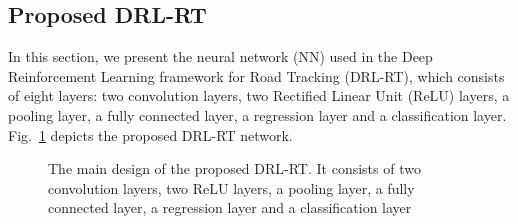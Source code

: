 \documentclass{svproc}
\begin{document}
%	
	
\subsection{Proposed DRL-RT} 
	In this section, we present the neural network (NN) used in the Deep Reinforcement Learning framework for Road Tracking (DRL-RT), which consists of eight layers: two convolution layers, two Rectified Linear Unit (ReLU) layers, a pooling layer, a fully connected layer, a regression layer and a classification layer. Fig.~\ref{Fig:Deep_Reinf_Net} depicts the proposed DRL-RT network.

\begin{figure}[!h]
	\vspace{-2ex}
	\centering
	\vspace{-2ex}
	\begin{scriptsize}	
		\caption{The main design of the proposed DRL-RT. It consists of two convolution layers, two ReLU layers, a pooling layer, a fully connected layer, a regression layer and a classification layer\label{Fig:Deep_Reinf_Net}}
	\end{scriptsize}
\end{figure}
\end{document}
